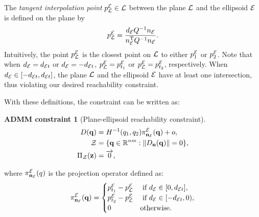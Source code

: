 \documentclass[10pt,twocolumn,twoside]{IEEEtran}
\newtheorem{constraint}{ADMM constraint}
\def\sZ{\mathcal{Z}}
\begin{document}
\begin{definition}
  The \emph{tangent interpolation point} $p^{\mathcal{E}}_{\mathcal{L}} \in \mathcal{L}$ between the plane $\mathcal{L}$ and the ellipsoid $\mathcal{E}$ is defined on the plane by 
    \begin{equation}\label{equ:ProjectPoint}
      p^{\mathcal{E}}_{\mathcal{L}} = \frac{ d_{\mathcal{E}} Q^{-1} n_{\mathcal{E}}}{ n_{\mathcal{E}}^\mathrm{T} Q^{-1} n_{\mathcal{E}}}.
    \end{equation}
  Intuitively, the point $p^{\mathcal{E}}_{\mathcal{L}}$ is the closest point on $\mathcal{L}$ to either $p^{\mathcal{E}}_1$ or $p^{\mathcal{E}}_2$.
  Note that when  $d_{\mathcal{E}}=d_{\mathcal{E} t}$ or $d_{\mathcal{E}}=-d_{\mathcal{E} t}$, $p^{\mathcal{E}}_{\mathcal{L}}=p^{\mathcal{E}}_{t_1}$ or $p^{\mathcal{E}}_{\mathcal{L}}=p^{\mathcal{E}}_{t_2}$, respectively. When $ d_{\mathcal{E}} \in [- d_{\mathcal{E} t},  d_{\mathcal{E} t}]$, the plane $\mathcal{L}$ and the ellipsoid $\mathcal{E}$ have at least one intersection, thus violating our desired reachability constraint. 
\end{definition}

With these definitions, the constraint can be written as:
\begin{constraint}[Plane-ellipsoid reachability constraint]
\begin{align}
D(\vq) &= H^{-1}(q_{1},q_2)\pi^\cE_{\vn_\cE}(\vq)+o, \label{eq:plane_ellipsoid_constraint}\\
  \sZ &= \{\vq\in\mathbb{R}^{nm}:\norm{D_{\vn}(\vq)} = 0 \},\\
   \Pi_\sZ(\vz) & = \overrightarrow{0}, 
\end{align}
\end{constraint}
where $\pi^{\mathcal{E}}_{\mathbf{n}_{\mathcal{E}}}(q)$ is the projection operator defined as:
  \begin{equation}\label{equ:plane2ellipse}
    \pi^{\mathcal{E}}_{\mathbf{n}_{\mathcal{E}}}(\mathbf{q}) =\begin{cases}
      p^{\mathcal{E}}_{t_1}-p^{\mathcal{E}}_{\mathcal{L}} & \textrm{ if } d_{\mathcal{E}} \in [0, d_{\mathcal{E} t}], \\
      p^{\mathcal{E}}_{t_2}-p^{\mathcal{E}}_{\mathcal{L}} &  \textrm{ if } d_{\mathcal{E}} \in [- d_{\mathcal{E} t},0), \\
      {0} & \textrm{otherwise}.
    \end{cases}
  \end{equation}
\end{document}
